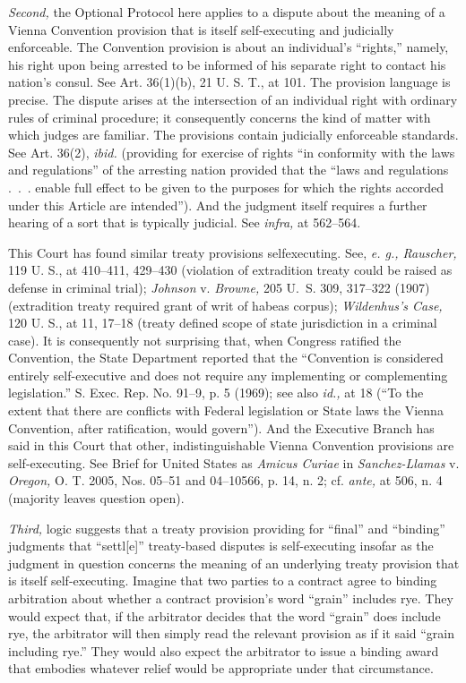{  \emph{Second,} the Optional Protocol here applies to a dispute about the
meaning of a Vienna Convention provision that is itself self-executing
and judicially enforceable. The Convention provision is about an
individual's ``rights,'' namely, his right upon being arrested to be
informed of his separate right to contact his nation's consul. See
Art. 36(1)(b), 21 U. S. T., at 101. The provision language is precise.
The dis\newpage pute arises at the intersection of an individual right
with ordinary rules of criminal procedure; it consequently concerns the
kind of matter with which judges are familiar. The provisions contain
judicially enforceable standards. See Art. 36(2), \emph{ibid.} (providing
for exercise of rights ``in conformity with the laws and regulations''
of the arresting nation provided that the ``laws and regulations
.~.~. enable full effect to be given to the purposes for which the
rights accorded under this Article are intended''). And the judgment
itself requires a further hearing of a sort that is typically judicial.
See \emph{infra,} at 562--564.

  This Court has found similar treaty provisions selfexecuting. See,
\emph{e. g., Rauscher,} 119 U. S., at 410--411, 429--430 (violation
of extradition treaty could be raised as defense in criminal trial);
\emph{Johnson} v. \emph{Browne,} 205 U.~S. 309, 317--322 (1907) (extradition
treaty required grant of writ of habeas corpus); \emph{Wildenhus's Case,}
120 U. S., at 11, 17--18 (treaty defined scope of state jurisdiction
in a criminal case). It is consequently not surprising that, when
Congress ratified the Convention, the State Department reported that the
``Convention is considered entirely self-executive and does not require
any implementing or complementing legislation.'' S. Exec. Rep. No.
91--9, p. 5 (1969); see also \emph{id.,} at 18 (``To the extent that
there are conflicts with Federal legislation or State laws the Vienna
Convention, after ratification, would govern''). And the Executive
Branch has said in this Court that other, indistinguishable Vienna
Convention provisions are self-executing. See Brief for United States
as \emph{Amicus Curiae} in \emph{Sanchez-Llamas} v. \emph{Oregon,} O. T. 2005,
Nos. 05--51 and 04--10566, p. 14, n. 2; cf. \emph{ante,} at 506, n. 4
(majority leaves question open).

  \emph{Third,} logic suggests that a treaty provision providing for
``final'' and ``binding'' judgments that ``settl[e]'' treaty-based
disputes is self-executing insofar as the judgment in question
concerns the meaning of an underlying treaty provision that is itself
self-executing. Imagine that two parties to a con\newpage tract agree
to binding arbitration about whether a contract provision's word
``grain'' includes rye. They would expect that, if the arbitrator
decides that the word ``grain'' does include rye, the arbitrator will
then simply read the relevant provision as if it said ``grain including
rye.'' They would also expect the arbitrator to issue a binding
award that embodies whatever relief would be appropriate under that
circumstance.

}
